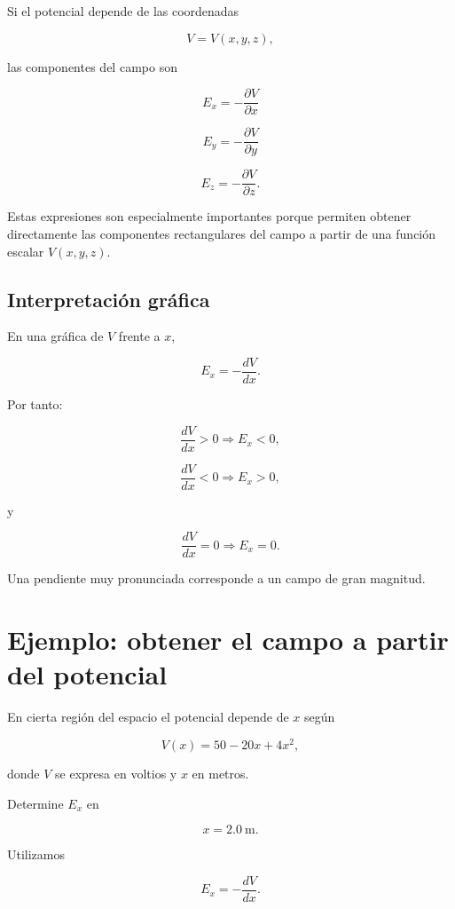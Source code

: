 Si el potencial depende de las coordenadas

\[
V=V(x,y,z),
\]

las componentes del campo son

\begin{equation}
\boxed{
E_x=-\frac{\partial V}{\partial x}
}
\end{equation}

\[
\boxed{
E_y=-\frac{\partial V}{\partial y}
}
\]

\[
\boxed{
E_z=-\frac{\partial V}{\partial z}
}.
\]

Estas expresiones son especialmente importantes porque permiten obtener directamente
las componentes rectangulares del campo a partir de una función escalar \(V(x,y,z)\).


\subsection{Interpretación gráfica}

En una gráfica de \(V\) frente a \(x\),

\[
E_x=-\frac{dV}{dx}.
\]

Por tanto:

\[
\frac{dV}{dx}>0
\Longrightarrow
E_x<0,
\]

\[
\frac{dV}{dx}<0
\Longrightarrow
E_x>0,
\]

y

\[
\frac{dV}{dx}=0
\Longrightarrow
E_x=0.
\]

Una pendiente muy pronunciada corresponde a un campo de gran magnitud.


\section{Ejemplo: obtener el campo a partir del potencial}

\begin{ejemplo}

En cierta región del espacio el potencial depende de \(x\) según

\[
V(x)=50-20x+4x^2,
\]

donde \(V\) se expresa en voltios y \(x\) en metros.

Determine \(E_x\) en

\[
x=\SI{2.0}{\metre}.
\]

\end{ejemplo}

Utilizamos

\[
E_x=-\frac{dV}{dx}.
\]


